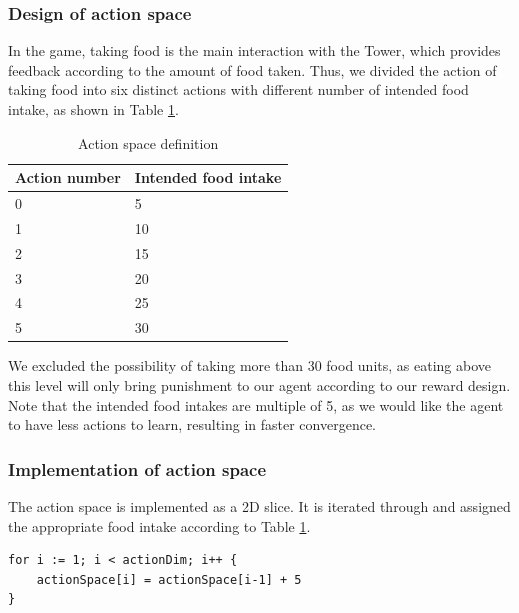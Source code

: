 \subsubsection{Design of action space}
In the game, taking food is the main interaction with the Tower, which provides feedback according to the amount of food taken. Thus, we divided the action of taking food into six distinct actions with different number of intended food intake, as shown in Table \ref{action-space}.
\begin{table}
\centering
\caption{Action space definition}
\begin{tabular}{@{}ll@{}}
\toprule
Action number & Intended food intake \\ \midrule
0             & 5                    \\
1             & 10                   \\
2             & 15                   \\
3             & 20                   \\
4             & 25                   \\
5             & 30                   \\ \bottomrule
\end{tabular}
\label{action-space}
\end{table}

We excluded the possibility of taking more than 30 food units, as eating above this level will only bring punishment to our agent according to our reward design. Note that the intended food intakes are multiple of 5, as we would like the agent to have less actions to learn, resulting in faster convergence. 
\subsubsection{Implementation of action space}
The action space is implemented as a 2D slice. It is iterated through and assigned the appropriate food intake according to Table \ref{action-space}.
\begin{lstlisting}
for i := 1; i < actionDim; i++ {
	actionSpace[i] = actionSpace[i-1] + 5
}
\end{lstlisting} 
